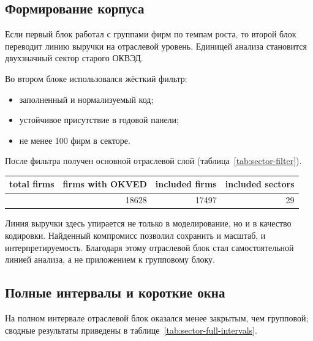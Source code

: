 \subsection{Формирование корпуса}
\label{sec:formirovanie-korpusa}

Если первый блок работал с группами фирм по темпам роста, то второй блок переводит линию выручки на отраслевой уровень. Единицей анализа становится двухзначный сектор старого ОКВЭД.

Во втором блоке использовался жёсткий фильтр:

\begin{itemize}
\tightlist
\item
  заполненный и нормализуемый код;
\item
  устойчивое присутствие в годовой панели;
\item
  не менее 100 фирм в секторе.
\end{itemize}

После фильтра получен основной отраслевой слой (таблица~\ref{tab:sector-filter}).

\begin{center}
\label{tab:sector-filter}
\end{center}

{\def\LTcaptype{none} %
\begin{longtable}[]{@{}rrrr@{}}
\toprule\noalign{}
total firms & firms with OKVED & included firms & included sectors \\
\midrule\noalign{}
\endhead
\bottomrule\noalign{}
\endlastfoot
23943 & 18628 & 17497 & 29 \\
\end{longtable}
}

Линия выручки здесь упирается не только в моделирование, но и в качество кодировки. Найденный компромисс позволил сохранить и масштаб, и интерпретируемость. Благодаря этому отраслевой блок стал самостоятельной линией анализа, а не приложением к групповому блоку.

\subsection{Полные интервалы и короткие окна}
\label{sec:polnye-intervaly-i-korotkie-okna}

На полном интервале отраслевой блок оказался менее закрытым, чем групповой; сводные результаты приведены в таблице~\ref{tab:sector-full-intervals}.

